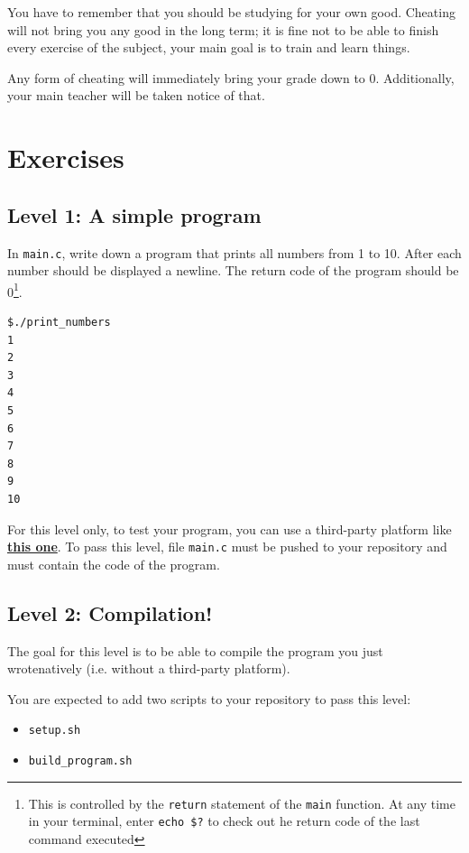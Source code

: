 \documentclass[12pt]{article}
\let\oldhref\href
\renewcommand{\href}[2]{\oldhref{#1}{\bfseries#2}}
\begin{document}
You have to remember that you should be studying for your own good. Cheating will not bring you any good in the long term; it is fine not to be able to finish every exercise of the subject, your main goal is to train and learn things.

Any form of cheating will immediately bring your grade down to 0. Additionally, your main teacher will be taken notice of that.

\section{Exercises}

\subsection{Level 1: A simple program}

In \texttt{main.c}, write down a program that prints all numbers from 1 to 10. After each number should be displayed a newline.
The return code of the program should be 0\footnote{This is controlled by the \texttt{return} statement of the \texttt{main} function. At any time in your terminal, enter \texttt{echo \$?} to check out he return code of the last command executed}.

\begin{lstlisting}[language=bash]
$./print_numbers
1
2
3
4
5
6
7
8
9
10
\end{lstlisting}

For this level only, to test your program, you can use a third-party platform like \href{https://www.onlinegdb.com/online\_c\_compiler}{this one}. To pass this level, file \texttt{main.c} must be pushed to your repository and must contain the code of the program.

\subsection{Level 2: Compilation!}

The goal for this level is to be able to compile the program you just wrotenatively (i.e. without a third-party platform).

You are expected to add two scripts to your repository to pass this level:
\begin{itemize}
	\item \texttt{setup.sh}
	\item \texttt{build\_program.sh}
\end{itemize}
\end{document}
